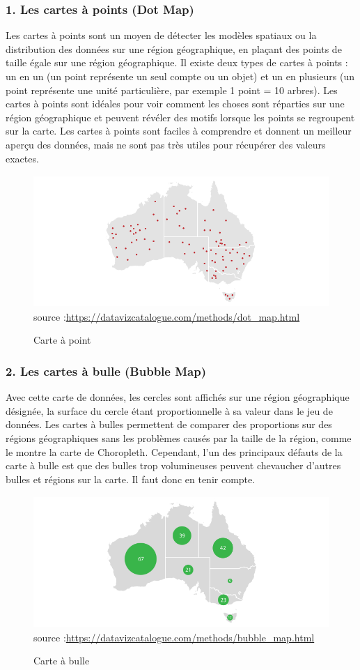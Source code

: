 \documentclass[french, a4paper, 12pt]{report}
\begin{document}
\subsubsection{1. Les cartes à points (Dot Map)}
Les cartes à points sont un moyen de détecter les modèles spatiaux ou la distribution des données sur une région géographique, en plaçant des points de taille égale sur une région géographique.
Il existe deux types de cartes à points : un en un (un point représente un seul compte ou un objet) et un en plusieurs (un point représente une unité particulière, par exemple 1 point = 10 arbres).
Les cartes à points sont idéales pour voir comment les choses sont réparties sur une région géographique et peuvent révéler des motifs lorsque les points se regroupent sur la carte. Les cartes à points sont faciles à comprendre et donnent un meilleur aperçu des données, mais ne sont pas très utiles pour récupérer des valeurs exactes.
\begin{figure}[!ht]
    \centering
    \includegraphics[height=5cm]{images/dot_map.png}
    \scriptsize{source :\url{https://datavizcatalogue.com/methods/dot_map.html}}
    \caption{Carte à point}
    \label{fig:1.7}
\end{figure}
\subsubsection{2. Les cartes à bulle (Bubble Map)}
Avec cette carte de données, les cercles sont affichés sur une région géographique désignée, la surface du cercle étant proportionnelle à sa valeur dans le jeu de données. Les cartes à bulles permettent de comparer des proportions sur des régions géographiques sans les problèmes causés par la taille de la région, comme le montre la carte de Choropleth. Cependant, l'un des principaux défauts de la carte à bulle est que des bulles trop volumineuses peuvent chevaucher d'autres bulles et régions sur la carte. Il faut donc en tenir compte.
\begin{figure}[!ht]
    \centering
    \includegraphics[height=5cm]{images/bubble_map.png}
    \scriptsize{source :\url{https://datavizcatalogue.com/methods/bubble_map.html}}
    \caption{Carte à bulle}
    \label{fig:1.8}
\end{figure}
\end{document}
